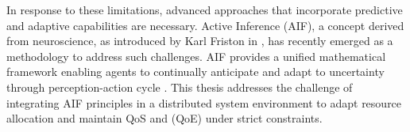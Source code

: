 In response to these limitations, advanced approaches that incorporate predictive and adaptive
capabilities are necessary. Active Inference (AIF), a concept derived from neuroscience, as introduced by Karl Friston in \cite{friston_free-energy_2010}, has recently emerged as a methodology to address such challenges. AIF provides a unified mathematical framework enabling agents to
continually anticipate and adapt to uncertainty through perception-action cycle \cite{friston_active_2016}\cite{lanillos_active_2021}. This thesis addresses the challenge of integrating AIF principles in a distributed system environment to adapt resource allocation and maintain QoS and (QoE) under strict constraints.




